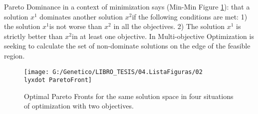 Pareto Dominance in a context of minimization says (Min-Min Figure
\ref{pareto_figure}): that a solution $x^{1}$ dominates another
solution $x^{2}$if the following conditions are met: 1) the solution
$x^{1}$is not worse than $x^{2}$ in all the objectives. 2) The solution
$x^{1}$ is strictly better than $x^{2}$in at least one objective.
In Multi-objective Optimization is seeking to calculate the set of
non-dominate solutions on the edge of the feasible region. 

\begin{figure}
\begin{centering}
\texttt{[image: G:/Genetico/LIBRO\_TESIS/04.ListaFiguras/02\\lyxdot ParetoFront]}
\par\end{centering}
\caption{Optimal Pareto Fronts for the same solution space in four situations
of optimization with two objectives.}
\label{pareto_figure}
\end{figure}

